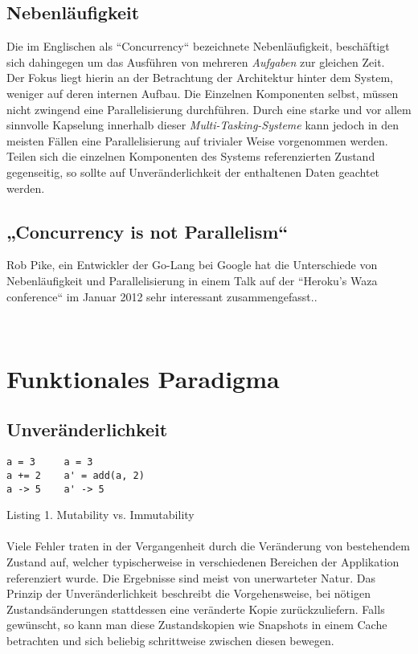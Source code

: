\documentclass[10pt,journal,compsoc]{IEEEtran}
\begin{document}
\subsection{Nebenläufigkeit}
Die im Englischen als ``Concurrency`` bezeichnete Nebenläufigkeit, beschäftigt sich dahingegen um das Ausführen von mehreren \textit{Aufgaben} zur gleichen Zeit. \cite{sevenCon}
\\Der Fokus liegt hierin an der Betrachtung der Architektur hinter dem System, weniger auf deren internen Aufbau. Die Einzelnen Komponenten selbst, müssen nicht zwingend eine Parallelisierung durchführen. Durch eine starke und vor allem sinnvolle Kapselung innerhalb dieser \textit{Multi-Tasking-Systeme} kann jedoch in den meisten Fällen eine Parallelisierung auf trivialer Weise vorgenommen werden. Teilen sich die einzelnen Komponenten des Systems referenzierten Zustand gegenseitig, so sollte auf Unveränderlichkeit der enthaltenen Daten geachtet werden.
\subsection{„Concurrency is not Parallelism“}
Rob Pike, ein Entwickler der Go-Lang bei Google hat die Unterschiede von Nebenläufigkeit und Parallelisierung in einem Talk auf der ``Heroku's Waza conference`` im Januar 2012 sehr interessant zusammengefasst..

~\\

\section{Funktionales Paradigma}

\subsection{Unveränderlichkeit}

\begin{lstlisting}[frame=single]
a = 3     a = 3
a += 2    a' = add(a, 2)
a -> 5    a' -> 5
\end{lstlisting}
\small{Listing 1. Mutability vs. Immutability}\\
~\\
Viele Fehler traten in der Vergangenheit durch die Veränderung von bestehendem Zustand auf, welcher typischerweise in verschiedenen Bereichen der Applikation referenziert wurde. Die Ergebnisse sind meist von unerwarteter Natur. Das Prinzip der Unveränderlichkeit beschreibt die Vorgehensweise, bei nötigen Zustandsänderungen stattdessen eine veränderte Kopie zurückzuliefern.
Falls gewünscht, so kann man diese Zustandskopien wie Snapshots in einem Cache betrachten und sich beliebig schrittweise zwischen diesen bewegen. 
\end{document}
